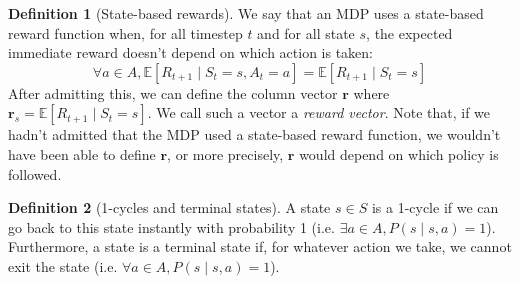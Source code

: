 \documentclass{article}
\theoremstyle{definition}
\newtheorem{definition}{Definition}[section]
\theoremstyle{remark}
\theoremstyle{example}
\newcommand*{\rf}{\mathbf{r}}           %
\begin{document}

\begin{definition}[State-based rewards]
		We say that an MDP uses a state-based reward function when, for all timestep $t$ and for all state $s$, the expected immediate reward doesn't depend on which action is taken:
				$$\forall a \in A, \mathbb{E}[R_{t+1} \mid S_t = s, A_t = a] = \mathbb{E}[R_{t+1} \mid S_t = s]$$
				After admitting this, we can define the column vector $\rf$ where $\rf_s = \mathbb{E}[R_{t+1} \mid S_t = s]$. We call such a vector a \textit{reward vector}. Note that, if we hadn't admitted that the MDP used a state-based reward function, we wouldn't have been able to define $\rf$, or more precisely, $\rf$ would depend on which policy is followed.
\end{definition}

\begin{definition}[1-cycles and terminal states]
		A state $s \in S$ is a 1-cycle if we can go back to this state instantly with probability 1 (i.e. $\exists a \in A, P(s \mid s, a) = 1$). Furthermore, a state is a terminal state if, for whatever action we take, we cannot exit the state (i.e. $\forall a \in A, P(s \mid s, a) = 1$).
\end{definition}
\end{document}
